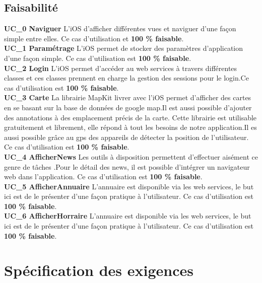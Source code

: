 	\subsection{Faisabilité}
		\textbf{UC\_0  Naviguer}  L'\gls{iOS} d'afficher différentes vues et naviguer d'une façon simple entre elles. Ce cas d'utilisation et \textbf{100 \%  faisable}.\\[0.2cm]
		\textbf{UC\_1  Paramétrage}  L'\gls{iOS} permet de stocker des paramètres d'application d'une façon simple. Ce cas d'utilisation est \textbf{100 \%  faisable}.\\[0.2cm]
		\textbf{UC\_2  Login}  L'\gls{iOS} permet d'accéder au web services à travers différentes classes et ces classes prennent en charge la gestion des sessions pour le login.Ce cas d'utilisation est \textbf{100 \%  faisable}.\\[0.2cm]
		\textbf{UC\_3  Carte}  La librairie MapKit livrer avec l'\gls{iOS} permet d'afficher des cartes en se basant sur la base de données de google map.Il est aussi possible d'ajouter des annotations à des emplacement précis de la carte. Cette librairie est utilisable gratuitement et librement, elle répond à tout les besoins de notre application.Il es aussi possible grâce au gps des appareils de détecter la position de l'utilisateur.  Ce cas d'utilisation est \textbf{100 \%  faisable}.\\[0.2cm]
		\textbf{UC\_4  AfficherNews}  Les outils à disposition permettent d'effectuer aisément ce genre de tâches  .Pour le détail des news, il est possible d'intégrer un navigateur web dans l'application. Ce cas d'utilisation est \textbf{100 \%  faisable}.\\[0.2cm]
		\textbf{UC\_5 AfficherAnnuaire}  L'annuaire est disponible via les web services, le but ici est de le présenter d'une façon pratique à l'utilisateur. Ce cas d'utilisation est \textbf{100 \%  faisable}.\\[0.2cm]
		\textbf{UC\_6 AfficherHorraire}  L'annuaire est disponible via les web services, le but ici est de le présenter d'une façon pratique à l'utilisateur. Ce cas d'utilisation est \textbf{100 \%  faisable}.\\[0.2cm]
\section{Spécification des exigences }
